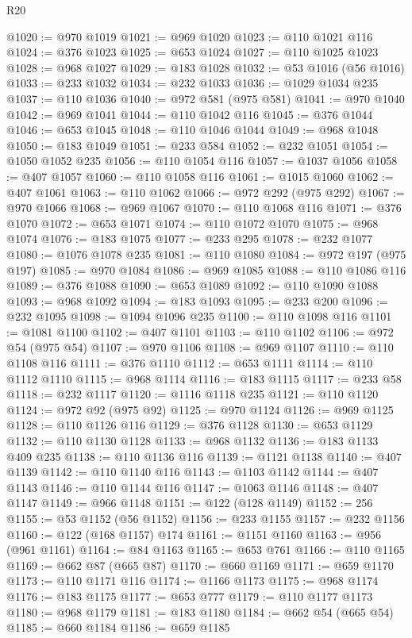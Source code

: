 \begin{lexlean}{R20}
\begin{coremodule}
@1020 := @970 @1019
@1021 := @969 @1020
@1023 := @110 @1021 @116
@1024 := @376 @1023
@1025 := @653 @1024
@1027 := @110 @1025 @1023
@1028 := @968 @1027
@1029 := @183 @1028
@1032 := @53 @1016 (@56 @1016)
@1033 := @233 @1032
@1034 := @232 @1033
@1036 := @1029 @1034 @235
@1037 := @110 @1036
@1040 := @972 @581 (@975 @581)
@1041 := @970 @1040
@1042 := @969 @1041
@1044 := @110 @1042 @116
@1045 := @376 @1044
@1046 := @653 @1045
@1048 := @110 @1046 @1044
@1049 := @968 @1048
@1050 := @183 @1049
@1051 := @233 @584
@1052 := @232 @1051
@1054 := @1050 @1052 @235
@1056 := @110 @1054 @116
@1057 := @1037 @1056
@1058 := @407 @1057
@1060 := @110 @1058 @116
@1061 := @1015 @1060
@1062 := @407 @1061
@1063 := @110 @1062
@1066 := @972 @292 (@975 @292)
@1067 := @970 @1066
@1068 := @969 @1067
@1070 := @110 @1068 @116
@1071 := @376 @1070
@1072 := @653 @1071
@1074 := @110 @1072 @1070
@1075 := @968 @1074
@1076 := @183 @1075
@1077 := @233 @295
@1078 := @232 @1077
@1080 := @1076 @1078 @235
@1081 := @110 @1080
@1084 := @972 @197 (@975 @197)
@1085 := @970 @1084
@1086 := @969 @1085
@1088 := @110 @1086 @116
@1089 := @376 @1088
@1090 := @653 @1089
@1092 := @110 @1090 @1088
@1093 := @968 @1092
@1094 := @183 @1093
@1095 := @233 @200
@1096 := @232 @1095
@1098 := @1094 @1096 @235
@1100 := @110 @1098 @116
@1101 := @1081 @1100
@1102 := @407 @1101
@1103 := @110 @1102
@1106 := @972 @54 (@975 @54)
@1107 := @970 @1106
@1108 := @969 @1107
@1110 := @110 @1108 @116
@1111 := @376 @1110
@1112 := @653 @1111
@1114 := @110 @1112 @1110
@1115 := @968 @1114
@1116 := @183 @1115
@1117 := @233 @58
@1118 := @232 @1117
@1120 := @1116 @1118 @235
@1121 := @110 @1120
@1124 := @972 @92 (@975 @92)
@1125 := @970 @1124
@1126 := @969 @1125
@1128 := @110 @1126 @116
@1129 := @376 @1128
@1130 := @653 @1129
@1132 := @110 @1130 @1128
@1133 := @968 @1132
@1136 := @183 @1133 @409 @235
@1138 := @110 @1136 @116
@1139 := @1121 @1138
@1140 := @407 @1139
@1142 := @110 @1140 @116
@1143 := @1103 @1142
@1144 := @407 @1143
@1146 := @110 @1144 @116
@1147 := @1063 @1146
@1148 := @407 @1147
@1149 := @966 @1148
@1151 := @122 (@128 @1149)
@1152 := 256
@1155 := @53 @1152 (@56 @1152)
@1156 := @233 @1155
@1157 := @232 @1156
@1160 := @122 (@168 @1157) @174
@1161 := @1151 @1160
@1163 := @956 (@961 @1161)
@1164 := @84 @1163
@1165 := @653 @761
@1166 := @110 @1165
@1169 := @662 @87 (@665 @87)
@1170 := @660 @1169
@1171 := @659 @1170
@1173 := @110 @1171 @116
@1174 := @1166 @1173
@1175 := @968 @1174
@1176 := @183 @1175
@1177 := @653 @777
@1179 := @110 @1177 @1173
@1180 := @968 @1179
@1181 := @183 @1180
@1184 := @662 @54 (@665 @54)
@1185 := @660 @1184
@1186 := @659 @1185

\end{coremodule}
\end{lexlean}
